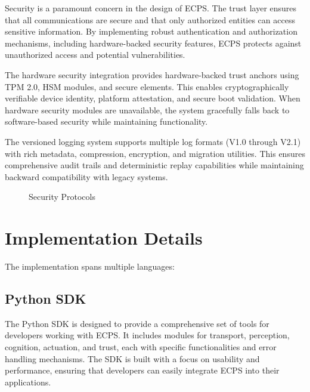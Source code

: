 \documentclass[12pt]{article}
\begin{document}
Security is a paramount concern in the design of ECPS. The trust layer ensures that all communications are secure and that only authorized entities can access sensitive information. By implementing robust authentication and authorization mechanisms, including hardware-backed security features, ECPS protects against unauthorized access and potential vulnerabilities.

The hardware security integration provides hardware-backed trust anchors using TPM 2.0, HSM modules, and secure elements. This enables cryptographically verifiable device identity, platform attestation, and secure boot validation. When hardware security modules are unavailable, the system gracefully falls back to software-based security while maintaining functionality.

The versioned logging system supports multiple log formats (V1.0 through V2.1) with rich metadata, compression, encryption, and migration utilities. This ensures comprehensive audit trails and deterministic replay capabilities while maintaining backward compatibility with legacy systems.

\begin{figure}[H]
\centering
{}
\caption{Security Protocols}
\end{figure}

\section{Implementation Details}
The implementation spans multiple languages:

\subsection{Python SDK}
The Python SDK is designed to provide a comprehensive set of tools for developers working with ECPS. It includes modules for transport, perception, cognition, actuation, and trust, each with specific functionalities and error handling mechanisms. The SDK is built with a focus on usability and performance, ensuring that developers can easily integrate ECPS into their applications.
\end{document}
